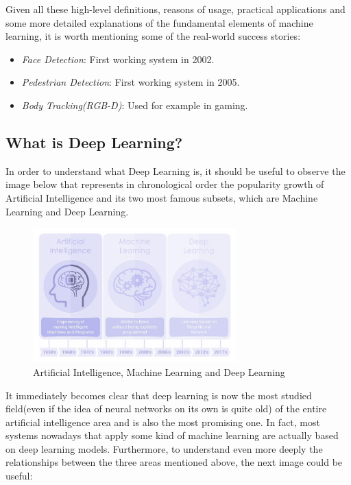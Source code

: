 \vspace{5mm}

Given all these high-level definitions, reasons of usage, practical
applications and some more detailed explanations of the fundamental
elements of machine learning, it is worth mentioning some of the
real-world success stories:

\begin{itemize}
    \item \emph{Face Detection}: First working system in 2002.
    \item \emph{Pedestrian Detection}: First working system in 2005.
    \item \emph{Body Tracking(RGB-D)}: Used for example in gaming.
\end{itemize}

\newpage

\subsection{What is Deep Learning?}

In order to understand what Deep Learning is, it should be useful to
observe the image below that represents in chronological order the
popularity growth of Artificial Intelligence and its two most famous
subsets, which are Machine Learning and Deep Learning.

\begin{figure}[h]
    \centering
    \includegraphics[width=0.7\textwidth]{../img/AI_ML_DL_1}
    \caption{Artificial Intelligence, Machine Learning and Deep Learning}
\end{figure}

It immediately becomes clear that deep learning is now the most
studied field(even if the idea of neural networks on its own is quite
old) of the entire artificial intelligence area and is also the
most promising one. In fact, most systems nowadays that apply some
kind of machine learning are actually based on deep learning models.
Furthermore, to understand even more deeply the relationships between
the three areas mentioned above, the next image could be useful:

